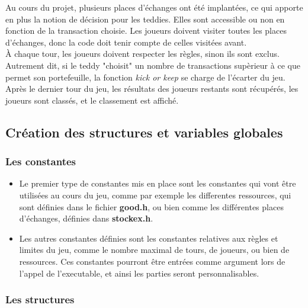 \documentclass{article}
\begin{document}
Au cours du projet, plusieurs places d'\'echanges ont \'et\'e implant\'ees, ce qui apporte en plus la notion de d\'ecision pour les teddies.
Elles sont accessible ou non en fonction de la transaction choisie. 
Les joueurs doivent visiter toutes les places d'\'echanges, donc la code doit tenir compte de celles visit\'ees avant.\\

\`A chaque tour, les joueurs doivent respecter les r\`egles, sinon ils sont exclus. Autrement dit, si le teddy "choisit" un nombre de transactions sup\`erieur \`a ce que permet son portefeuille, la fonction \textit{kick or keep} se charge de l'\'ecarter du jeu. 
Apr\`es le dernier tour du jeu, les r\'esultats des joueurs restants sont r\'ecup\'er\'es, les joueurs sont class\'es, et le classement est affich\'e. 


\subsection{Cr\'eation des structures et variables globales}

\subsubsection{Les constantes}

\begin{itemize}

\item Le premier type de constantes mis en place sont les constantes qui vont \^etre utilis\'ees au cours du jeu, comme par exemple les differentes ressources,
qui sont d\'efinies dans le fichier \textbf{good.h}, ou bien comme les diff\'erentes places d'\'echanges, d\'efinies dans \textbf{stockex.h}.
\item Les autres constantes d\'efinies sont les constantes relatives aux r\`egles et limites du jeu, comme le nombre maximal de tours, de joueurs, ou bien de ressources. 
Ces constantes pourront \^etre entr\'ees comme argument lors de l'appel de l'executable, et ainsi les parties seront personnalisables. 

\end{itemize} 

\vspace*{10mm}

\subsubsection{Les structures}
\end{document}

